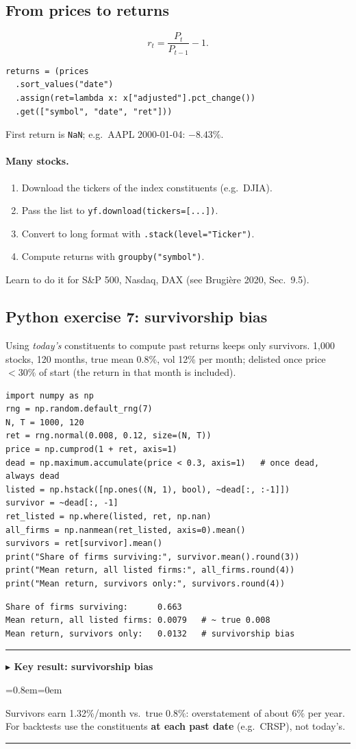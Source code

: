 \documentclass[11pt,a4paper]{report}
\newenvironment{notebox}[1]
  {\par\medskip\Needspace{6\baselineskip}\noindent\rule{\linewidth}{0.4pt}\par\nopagebreak
   \noindent\textbf{#1}\par\nopagebreak
   \begin{list}{}{\leftmargin=0.8em\rightmargin=0em\topsep=2pt}\item[]}
  {\end{list}\nopagebreak\noindent\rule{\linewidth}{0.4pt}\par\medskip}
\newenvironment{keybox}[1][]{\begin{notebox}{$\blacktriangleright$ Key result#1}}{\end{notebox}}
\begin{document}
\subsection{From prices to returns}
\[ r_t=\frac{P_t}{P_{t-1}}-1. \]
\begin{lstlisting}
returns = (prices
  .sort_values("date")
  .assign(ret=lambda x: x["adjusted"].pct_change())
  .get(["symbol", "date", "ret"]))
\end{lstlisting}
First return is \texttt{NaN}; e.g.\ AAPL 2000-01-04: $-8.43\%$.

\paragraph{Many stocks.}
\begin{enumerate}
  \item Download the tickers of the index constituents (e.g.\ DJIA).
  \item Pass the list to \texttt{yf.download(tickers=[...])}.
  \item Convert to long format with \texttt{.stack(level="Ticker")}.
  \item Compute returns with \texttt{groupby("symbol")}.
\end{enumerate} Learn to do it for S\&P 500, Nasdaq, DAX
(see Brugi\`ere 2020, Sec.~9.5).

\subsection*{Python exercise 7: survivorship bias}
Using \emph{today's} constituents to compute past returns keeps only survivors.
1{,}000 stocks, 120 months, true mean 0.8\%, vol 12\% per month; delisted once
price $<30\%$ of start (the return in that month is included).
\begin{lstlisting}
import numpy as np
rng = np.random.default_rng(7)
N, T = 1000, 120
ret = rng.normal(0.008, 0.12, size=(N, T))
price = np.cumprod(1 + ret, axis=1)
dead = np.maximum.accumulate(price < 0.3, axis=1)   # once dead, always dead
listed = np.hstack([np.ones((N, 1), bool), ~dead[:, :-1]])
survivor = ~dead[:, -1]
ret_listed = np.where(listed, ret, np.nan)
all_firms = np.nanmean(ret_listed, axis=0).mean()
survivors = ret[survivor].mean()
print("Share of firms surviving:", survivor.mean().round(3))
print("Mean return, all listed firms:", all_firms.round(4))
print("Mean return, survivors only:", survivors.round(4))
\end{lstlisting}
\begin{lstlisting}[style=out]
Share of firms surviving:      0.663
Mean return, all listed firms: 0.0079   # ~ true 0.008
Mean return, survivors only:   0.0132   # survivorship bias
\end{lstlisting}
\begin{keybox}[: survivorship bias]
Survivors earn 1.32\%/month vs.\ true 0.8\%: overstatement of about 6\% per
year. For backtests use the constituents \textbf{at each past date} (e.g.\
CRSP), not today's.
\end{keybox}
\end{document}
